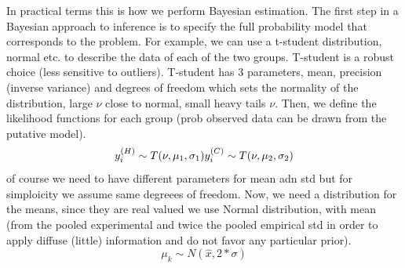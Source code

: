 \documentclass[11pt]{article}
\theoremstyle{definition}
\theoremstyle{remark}
\begin{document}


In practical terms  this is how we perform Bayesian estimation.
The first step in a Bayesian approach to inference is to specify the full probability model that corresponds to the problem. For example, we can use a t-student distribution, normal etc. to describe the data of each of the two groups. T-student is a robust choice (less sensitive to outliers). T-student has 3 parameters, mean, precision (inverse variance) and degrees of freedom which sets the normality of the distribution, large $\nu$ close to normal, small heavy tails $\nu$. Then, we define the likelihood functions for each group (prob observed data can be drawn from the putative model).
\begin{equation}
y_i^{(H)} \sim T(\nu, \mu_1, \sigma_1) \\
y_i^{(C)} \sim T(\nu, \mu_2, \sigma_2)
\end{equation}   
of course we need to have different parameters for mean adn std but for simploicity we assume same degreees of freedom.
Now, we need a distribution for the means, since they are real valued we use Normal distribution, with mean (from the pooled experimental and twice the pooled empirical std in order to apply diffuse (little) information and do not favor any particular prior).
\begin{equation}
\mu_k \sim N(\hat{x}, 2*\sigma)
\end{equation}
\end{document}
